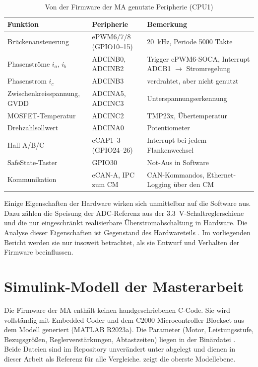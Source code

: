 \begin{table}[htbp]
  \centering
  \caption{Von der Firmware der \ac{MA} genutzte Peripherie (CPU1)}
  \label{tab:peripherie}
  \small
  \begin{tabularx}{\linewidth}{@{}>{\raggedright}p{36mm}>{\raggedright}p{34mm}
      >{\raggedright\arraybackslash}X@{}}
    \toprule
    Funktion & Peripherie & Bemerkung \\
    \midrule
    Brückenansteuerung & ePWM6/7/8 (GPIO10--15) & \SI{20}{\kilo\hertz}, Periode 5000 Takte \\
    Phasenströme $i_a$, $i_b$ & ADCINB0, ADCINB2 & Trigger ePWM6-SOCA, Interrupt ADCB1 $\to$ Stromregelung \\
    Phasenstrom $i_c$ & ADCINB3 & verdrahtet, aber nicht genutzt \\
    Zwischenkreisspannung, GVDD & ADCINA5, ADCINC3 & Unterspannungserkennung \\
    MOSFET-Temperatur & ADCINC2 & TMP23x, Übertemperatur \\
    Drehzahlsollwert & ADCINA0 & Potentiometer \\
    Hall A/B/C & eCAP1--3 (GPIO24--26) & Interrupt bei jedem Flankenwechsel \\
    SafeState-Taster & GPIO30 & Not-Aus in Software \\
    Kommunikation & eCAN-A, IPC zum CM & CAN-Kommandos, Ethernet-Logging über den CM \\
    \bottomrule
  \end{tabularx}
\end{table}

Einige Eigenschaften der Hardware wirken sich unmittelbar auf die Software aus. Dazu
zählen die Speisung der ADC-Referenz aus der \SI{3,3}{\volt}-Schaltreglerschiene und die
nur eingeschränkt realisierbare Überstromabschaltung in Hardware. Die Analyse dieser
Eigenschaften ist Gegenstand des Hardwareteils . Im vorliegenden
Bericht werden sie nur insoweit betrachtet, als sie Entwurf und Verhalten der Firmware
beeinflussen.

\section{Simulink-Modell der Masterarbeit}
\label{sec:impmodel}

Die Firmware der \ac{MA} \cite{akguel2023} enthält keinen handgeschriebenen C-Code. Sie
wird vollständig mit Embedded Coder \cite{mw_ecoder} und dem C2000 Microcontroller Blockset
\cite{mw_c2000} aus dem Modell  generiert (MATLAB R2023a). Die Parameter
(Motor, Leistungsstufe, Bezugsgrößen, Reglerverstärkungen, Abtastzeiten) liegen in der
Binärdatei . Beide Dateien sind im Repository unverändert unter
 abgelegt und dienen in dieser Arbeit als Referenz für alle
Vergleiche.  zeigt die oberste Modellebene.

